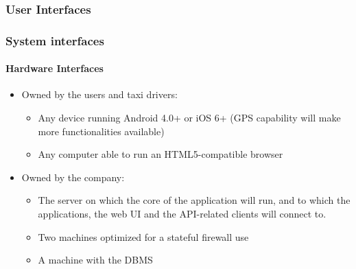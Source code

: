 \documentclass{article}
\begin{document}
\subsubsection{User Interfaces}
\subsubsection{System interfaces}
 %
\paragraph{Hardware Interfaces}
\begin{itemize}
\item Owned by the users and taxi drivers:
	\begin{itemize}
		\item Any device running Android 4.0+ or iOS 6+ (GPS capability will make more functionalities available)
		\item Any computer able to run an HTML5-compatible browser 
	\end{itemize}
\item Owned by the company:
	\begin{itemize}
		\item The server on which the core of the application will run, and to which the applications, 
			the web UI and the API-related clients will connect to.
		\item Two machines optimized for a stateful firewall use
		\item A machine with the DBMS 
	\end{itemize}
\end{itemize}
\end{document}
